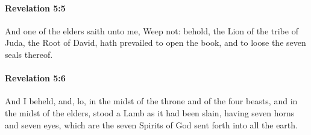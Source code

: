 		\paragraph{Revelation 5:5} %
			\label{REVELATIONNT-5-5}

			And one of the elders saith unto me, Weep not: behold, the Lion of the tribe of Juda, the Root of David, hath prevailed to open the book, and to loose the seven seals thereof.

			\begin{framed}
			\scriptsize
				\begin{compactdesc}
					\item[SBLG] 
				\end{compactdesc}
			\end{framed}

		\paragraph{Revelation 5:6} %
			\label{REVELATIONNT-5-6}

			And I beheld, and, lo, in the midst of the throne and of the four beasts, and in the midst of the elders, stood a Lamb as it had been slain, having seven horns and seven eyes, which are the seven Spirits of God sent forth into all the earth.

